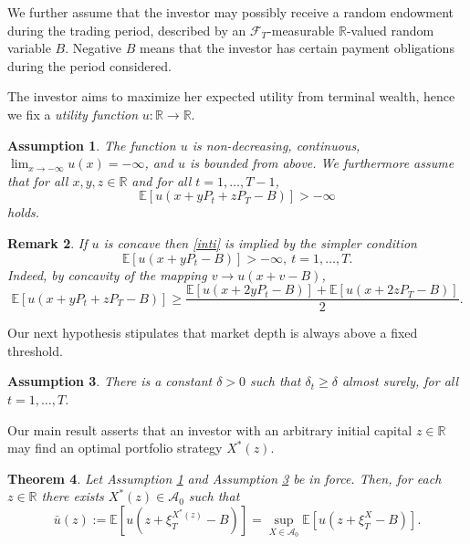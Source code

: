\documentclass[a4paper]{article}
\newtheorem{theorem}{Theorem}[section]
\newtheorem{remark}[theorem]{Remark}
\newtheorem{assumption}[theorem]{Assumption}
\begin{document}
We further assume that the investor may possibly receive a random endowment during the trading period, 
described by an $\mathcal{F}_{T}$-measurable $\mathbb{R}$-valued
random variable $B$. Negative $B$ means that the investor has certain
payment obligations during the period considered.

The investor aims to maximize her expected utility from terminal wealth, hence we fix a \emph{utility function} $u:\mathbb{R}\to\mathbb{R}$.

\begin{assumption}\label{uint} The function $u$ is non-decreasing, continuous, $\lim_{x \to -\infty}u(x)=-\infty$, and $u$ is bounded from above.
We furthermore assume that for all $x,y,z\in\mathbb{R}$ and for all $t=1,\ldots,T-1$, 
\begin{equation}\label{inti}
\mathbb{E}[u(x+y P_{t}+zP_{T}-B)]>-\infty
\end{equation}
holds.
\end{assumption}

\begin{remark}{\rm If $u$ is concave then \eqref{inti} is implied by the simpler condition
\begin{equation*}
\mathbb{E}[u(x+y P_{t}-B)]>-\infty,\ t=1,\ldots,T.
\end{equation*}
Indeed, by concavity of the mapping $v\to u(x+v-B)$,
$$
\mathbb{E}\left[u(x+y P_{t}+zP_{T}-B)\right]\geq \frac{\mathbb{E}\left[u(x+2y P_{t}-B)\right]+\mathbb{E}\left[u(x+2zP_{T}-B)\right]}{2}.
$$
}
\end{remark}

Our next hypothesis stipulates that market depth is always above a fixed threshold.

\begin{assumption}\label{deltacska}
There is a constant $\delta>0$ such that $\delta_{t}\geq \delta$ almost surely, for all $t=1,\ldots,T$.	
\end{assumption}


Our main result asserts that an investor with an arbitrary initial capital $z\in\mathbb{R}$ may
find an optimal portfolio strategy $X^{*}(z)$.

\begin{theorem}\label{main} Let Assumption \ref{uint} and Assumption \ref{deltacska} be in force.
Then, for each $z\in\mathbb{R}$ there exists $X^{*}(z)\in \mathcal{A}_{0}$ such that
$$
\bar{u}(z):=\mathbb{E}\left[u\left(z+\xi^{X^{*}(z)}_{T}-B\right)\right]=\sup_{X\in\mathcal{A}_{0}}\mathbb{E}\left[u\left(z+\xi^{X}_{T}-
B\right)\right].
$$
\end{theorem}
\end{document}
